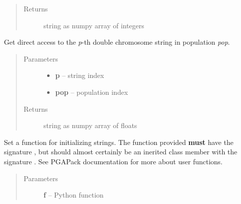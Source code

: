 \documentclass[letterpaper,11pt,english]{sphinxmanual}
\begin{document}
\begin{fulllineitems}
\begin{fulllineitems}
\begin{quote}
\begin{description}
\begin{itemize}
\end{itemize}

\item[{Returns}] \leavevmode
string as numpy array of integers

\end{description}\end{quote}

\end{fulllineitems}


\begin{fulllineitems}
\label{api_reference:PGA.GetRealChromosome}
Get direct access to the \emph{p}-th double chromosome string in population \emph{pop}.
\begin{quote}\begin{description}
\item[{Parameters}] \leavevmode\begin{itemize}
\item {} 
\textbf{p} -- string index

\item {} 
\textbf{pop} -- population index

\end{itemize}

\item[{Returns}] \leavevmode
string as numpy array of floats

\end{description}\end{quote}

\end{fulllineitems}


\begin{fulllineitems}
\label{api_reference:PGA.SetInitString}
Set a function for initializing strings.  The function  provided
\textbf{must} have the signature , but should almost certainly
be an inerited class member with the signature .
See PGAPack documentation for more about user functions.
\begin{quote}\begin{description}
\item[{Parameters}] \leavevmode
\textbf{f} -- Python function


\end{description}
\end{quote}
\end{fulllineitems}
\end{fulllineitems}
\end{document}
